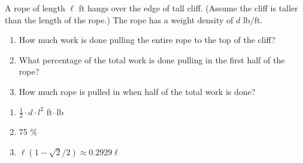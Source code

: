 {A rope of length $\ell$ ft hangs over the edge of tall cliff. (Assume the cliff is taller than the length of the rope.) The rope has a weight density of $d$ lb/ft.
	\begin{enumerate}
	\item		How much work is done pulling the entire rope to the top of the cliff?
	\item		What percentage of the total work is done pulling in the first half of the rope?
	\item		How much rope is pulled in when half of the total work is done?
	\end{enumerate}}
{\begin{enumerate}
	\item 	$\frac12\cdot d\cdot l^2$ ft--lb
	\item		75 \%
	\item		$\ell(1-\sqrt{2}/2) \approx 0.2929\ell$
	\end{enumerate}
}

